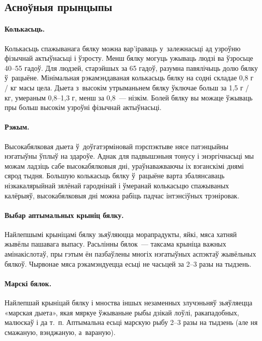\subsection{Асноўныя прынцыпы}

\paragraph{Колькасьць.}
Колькасьць спажыванага бялку можна вар'іраваць у~залежнасьці ад узроўню фізычнай актыўнасьці і ўзросту. Менш бялку могуць ужываць людзі ва ўзросьце 40--55 гадоў. Для людзей, старэйшых за 65 гадоў, разумна павялічыць долю бялку ў~рацыёне. Мінімальная рэкамэндаваная колькасьць бялку на содні складае 0,8 г / кг масы цела. Дыета з~высокім утрыманьнем бялку ўключае больш за 1,5 г / кг, умераным 0,8--1,3 г, менш за 0,8~--- нізкім. Болей бялку вы можаце ўжываць пры больш высокім узроўні фізычнай актыўнасьці.

\paragraph{Рэжым.}
Высокабялковая дыета ў~доўгатэрміновай пэрспэктыве нясе патэнцыйны нэгатыўны ўплыў на здароўе. Аднак для падвышэньня тонусу і энэргічнасьці мы можам ладзіць сабе высокабялковыя дні, ураўнаважваючы іх вэганскімі днямі сярод тыдня. Большую колькасьць бялку ў~рацыёне варта збалянсаваць нізкакалярыйнай зялёнай гароднінай і ўмеранай колькасьцю спажываных калёрыяў, высокабялковыя дні можна рабіць падчас інтэнсіўных трэніровак.

\paragraph{Выбар аптымальных крыніц бялку.}
Найлепшымі крыніцамі бялку зьяўляюцца морапрадукты, яйкі, мяса хатняй жывёлы пашавага выпасу. Расьлінны бялок~--- таксама крыніца важных амінакіслотаў, пры гэтым ён пазбаўлены многіх нэгатыўных аспэктаў жывёльных бялкоў. Чырвонае мяса рэкамэндуецца есьці не часьцей за 2--3 разы на тыдзень.

\paragraph{Марскі бялок.}
Найлепшай крыніцай бялку і мноства іншых незаменных злучэньняў зьяўляецца «марская дыета», якая мяркуе ўжываньне рыбы дзікай лоўлі, ракападобных, малюскаў і да т.~п. Аптымальна есьці марскую рыбу 2--3 разы на тыдзень (але ня смажаную, вэнджаную, а~вараную).

